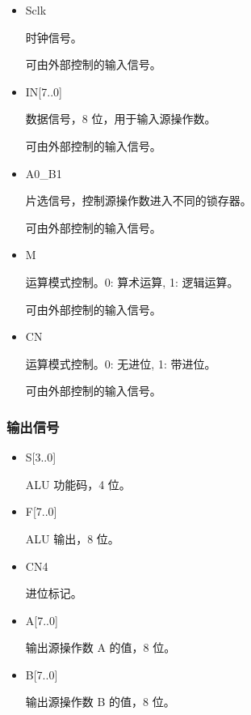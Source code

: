 \begin{itemize}
    \item Sclk
    
    时钟信号。

    可由外部控制的输入信号。
    
    \item IN[7..0]
    
    数据信号，8 位，用于输入源操作数。
    
    可由外部控制的输入信号。
    
    \item A0\_B1
    
    片选信号，控制源操作数进入不同的锁存器。
    
    可由外部控制的输入信号。
    
    \item M
    
    运算模式控制。0: 算术运算, 1: 逻辑运算。
    
    可由外部控制的输入信号。
    
    \item CN
    
    运算模式控制。0: 无进位, 1: 带进位。
    
    可由外部控制的输入信号。
    
\end{itemize} 

\subsubsection{输出信号}

\begin{itemize}
    \item S[3..0]
    
    ALU 功能码，4 位。
    
    \item F[7..0]
    
    ALU 输出，8 位。
    
    \item CN4
    
    进位标记。
    
    \item A[7..0]
    
    输出源操作数 A 的值，8 位。
    
    \item B[7..0]
    
    输出源操作数 B 的值，8 位。
    
\end{itemize}

